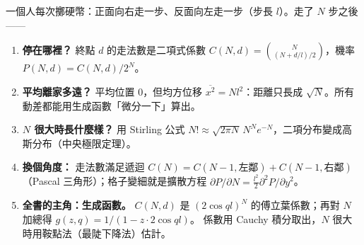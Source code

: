 \documentclass[11pt,a4paper]{article}
\newcommand{\avg}[1]{\overline{#1}}
\begin{document}
\begin{keybox}[第 1 章一頁看懂]
一個人每次擲硬幣：正面向右走一步、反面向左走一步（步長 $l$）。走了 $N$ 步之後——
\begin{enumerate}[nosep]
\item \textbf{停在哪裡？} 終點 $d$ 的走法數是二項式係數 $C(N,d)=\binom{N}{(N+d/l)/2}$，機率 $P(N,d)=C(N,d)/2^N$。
\item \textbf{平均離家多遠？} 平均位置 $0$，但均方位移 $\avg{x^2}=Nl^2$：距離只長成 $\sqrt N$。所有動差都能用生成函數「微分一下」算出。
\item \textbf{$N$ 很大時長什麼樣？} 用 Stirling 公式 $N!\approx\sqrt{2\pi N}\,N^Ne^{-N}$，二項分布變成高斯分布（中央極限定理）。
\item \textbf{換個角度：} 走法數滿足遞迴 $C(N)=C(N-1,\text{左鄰})+C(N-1,\text{右鄰})$（Pascal 三角形）；格子變細就是擴散方程
      $\partial P/\partial N=\frac{l^2}{2}\partial^2P/\partial y^2$。
\item \textbf{全書的主角：生成函數。} $C(N,d)$ 是 $(2\cos ql)^N$ 的傅立葉係數；再對 $N$ 加總得 $g(z,q)=1/(1-z\cdot2\cos ql)$。
      係數用 Cauchy 積分取出，$N$ 很大時用鞍點法（最陡下降法）估計。
\end{enumerate}
\end{keybox}

\setcounter{tocdepth}{3}
\begingroup
\setlength{\parskip}{0pt}
\tableofcontents
\endgroup
\end{document}

